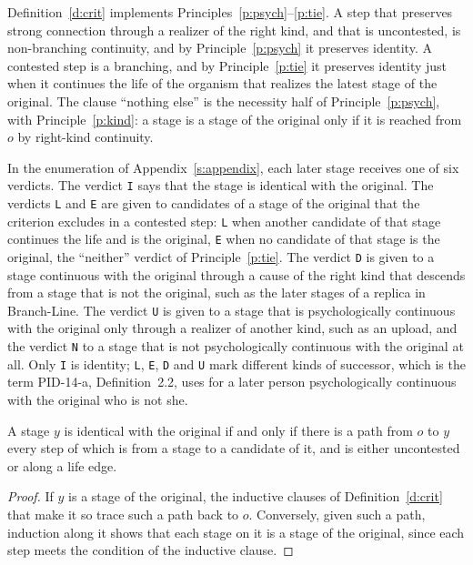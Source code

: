 \documentclass{situationist-preprint}
\begin{document}
Definition~\ref{d:crit} implements Principles~\ref{p:psych}--\ref{p:tie}. A step that preserves strong connection through a realizer of the right kind, and that is uncontested, is non-branching continuity, and by Principle~\ref{p:psych} it preserves identity. A contested step is a branching, and by Principle~\ref{p:tie} it preserves identity just when it continues the life of the organism that realizes the latest stage of the original. The clause \enquote{nothing else} is the necessity half of Principle~\ref{p:psych}, with Principle~\ref{p:kind}: a stage is a stage of the original only if it is reached from $o$ by right-kind continuity.

In the enumeration of Appendix~\ref{s:appendix}, each later stage receives one of six verdicts. The verdict \texttt{I} says that the stage is identical with the original. The verdicts \texttt{L} and \texttt{E} are given to candidates of a stage of the original that the criterion excludes in a contested step: \texttt{L} when another candidate of that stage continues the life and is the original, \texttt{E} when no candidate of that stage is the original, the \enquote{neither} verdict of Principle~\ref{p:tie}. The verdict \texttt{D} is given to a stage continuous with the original through a cause of the right kind that descends from a stage that is not the original, such as the later stages of a replica in Branch-Line. The verdict \texttt{U} is given to a stage that is psychologically continuous with the original only through a realizer of another kind, such as an upload, and the verdict \texttt{N} to a stage that is not psychologically continuous with the original at all. Only \texttt{I} is identity; \texttt{L}, \texttt{E}, \texttt{D} and \texttt{U} mark different kinds of successor, which is the term PID-14-a, Definition~2.2, uses for a later person psychologically continuous with the original who is not she.

\begin{proposition}\label{p:path}
A stage $y$ is identical with the original if and only if there is a path from $o$ to $y$ every step of which is from a stage to a candidate of it, and is either uncontested or along a life edge.
\end{proposition}

\begin{proof}
If $y$ is a stage of the original, the inductive clauses of Definition~\ref{d:crit} that make it so trace such a path back to $o$. Conversely, given such a path, induction along it shows that each stage on it is a stage of the original, since each step meets the condition of the inductive clause.
\end{proof}
\end{document}
